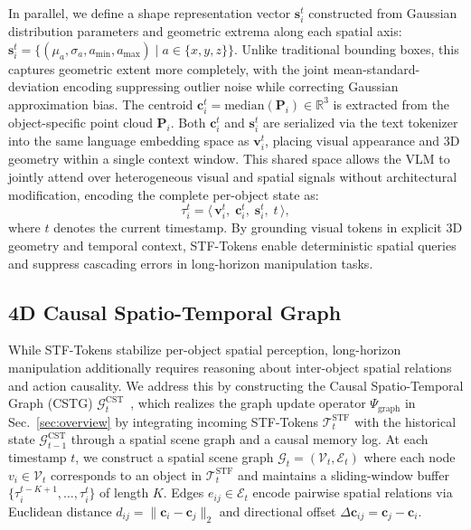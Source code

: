 In parallel, we define a shape representation vector $\mathbf{s}_i^t$ constructed from Gaussian distribution parameters and geometric extrema along each spatial axis: $\mathbf{s}_i^t = \{(\mu_a, \sigma_a, a_{\min}, a_{\max}) \mid a \in \{x,y,z\}\}$. Unlike traditional bounding boxes, this captures geometric extent more completely, with the joint mean-standard-deviation encoding suppressing outlier noise while correcting Gaussian approximation bias. The centroid $\mathbf{c}_i^t = \mathrm{median}(\mathbf{P}_i) \in \mathbb{R}^3$ is extracted from the object-specific point cloud $\mathbf{P}_i$. Both $\mathbf{c}_i^t$ and $\mathbf{s}_i^t$ are serialized via the text tokenizer into the same language embedding space as $\mathbf{v}_i^t$, placing visual appearance and 3D geometry within a single context window. This shared space allows the VLM to jointly attend over heterogeneous visual and spatial signals without architectural modification, encoding the complete per-object state as:
\begin{equation}
\tau_i^t = \Big\langle \, \mathbf{v}_i^t, \; \mathbf{c}_i^t, \; \mathbf{s}_i^t, \; t \, \Big\rangle,
\label{eq:stf_token}
\end{equation}
where $t$ denotes the current timestamp. By grounding visual tokens in explicit 3D geometry and temporal context, STF-Tokens enable deterministic spatial queries and suppress cascading errors in long-horizon manipulation tasks.




\subsection{4D Causal Spatio-Temporal Graph}
\label{sec:cstg}

While STF-Tokens stabilize per-object spatial perception, long-horizon manipulation additionally requires reasoning about inter-object spatial relations and action causality. We address this by constructing the Causal Spatio-Temporal Graph (CSTG) $\mathcal{G}_t^{\text{CST}}$~\cite{armeni20193d, wald2020learning}, which realizes the graph update operator $\Psi_{\text{graph}}$ in Sec.~\ref{sec:overview} by integrating incoming STF-Tokens $\mathcal{T}_t^{\text{STF}}$ with the historical state $\mathcal{G}_{t-1}^{\text{CST}}$ through a spatial scene graph and a causal memory log. At each timestamp $t$, we construct a spatial scene graph $\mathcal{G}_t = (\mathcal{V}_t, \mathcal{E}_t)$ where each node $v_i \in \mathcal{V}_t$ corresponds to an object in $\mathcal{T}_t^{\text{STF}}$ and maintains a sliding-window buffer $\{\tau_i^{t-K+1}, \ldots, \tau_i^{t}\}$ of length $K$. Edges $e_{ij} \in \mathcal{E}_t$ encode pairwise spatial relations via Euclidean distance $d_{ij} = \|\mathbf{c}_i - \mathbf{c}_j\|_2$ and directional offset $\Delta\mathbf{c}_{ij} = \mathbf{c}_j - \mathbf{c}_i$.

